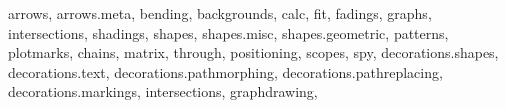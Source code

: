 \usepackage{tikz}


\usetikzlibrary
			{%
				arrows,
				arrows.meta,
				bending,
				backgrounds,
				calc,
				fit,
				fadings,
				graphs,
				intersections,
				shadings,
				shapes,
				shapes.misc,
				shapes.geometric,
 				patterns,
 				plotmarks,
				chains,  %
 				matrix,
 				through,
 				positioning,  %
 				scopes,
				spy,
				decorations.shapes,
				decorations.text,
				decorations.pathmorphing,
				decorations.pathreplacing,
				decorations.markings,
				intersections,
			}
\ifluatex
    \usetikzlibrary
			{%
				graphdrawing,
			}
\fi



\newcommand*\circled[1]
		{
			\tikz
				[
					baseline=(char.base)
				]
				{
					\node
						[
							shape=circle,
							draw,
							inner sep=1pt
						] 
						(char)
						{#1}
						;
					}
				}

\newcommand*{\ExtractCoordinate}[3]{\newdimen{#2}\newdimen{#3}\path (#1); \pgfgetlastxy{#2}{#3};}


